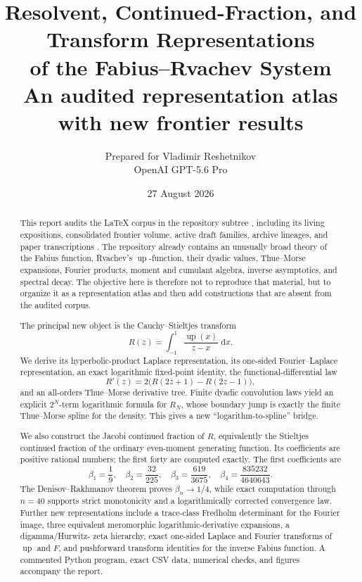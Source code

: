 \documentclass[11pt]{article}
\title{\textbf{Resolvent, Continued-Fraction, and Transform Representations\\
       of the Fabius--Rvachev System}\\[5pt]
       \large An audited representation atlas with new frontier results}
\author{Prepared for Vladimir Reshetnikov\\
        OpenAI GPT-5.6 Pro}
\date{27 August 2026}
\theoremstyle{definition}
\theoremstyle{remark}
\newcommand{\dd}{\,\mathrm d}
\newcommand{\Up}{\operatorname{up}}
\begin{document}
\maketitle

\begin{abstract}
This report audits the LaTeX corpus in the repository subtree
, including its living expositions, consolidated frontier
volume, active draft families, archive lineages, and paper transcriptions \cite{p3:Repository}.  The repository already contains an unusually
broad theory of the Fabius function, Rvachev's \(\Up\)-function, their dyadic values,
Thue--Morse expansions, Fourier products, moment and cumulant algebra, inverse asymptotics,
and spectral decay.  The objective here is therefore not to reproduce that material, but to
organize it as a representation atlas and then add constructions that are absent from the
audited corpus.

The principal new object is the Cauchy--Stieltjes transform
\[
 R(z)=\int_{-1}^{1}\frac{\Up(x)}{z-x}\,\dd x.
\]
We derive its hyperbolic-product Laplace representation, its one-sided Fourier--Laplace
representation, an exact logarithmic fixed-point identity, the functional-differential law
\[
 R'(z)=2\bigl(R(2z+1)-R(2z-1)\bigr),
\]
and an all-orders Thue--Morse derivative tree.  Finite dyadic convolution laws yield an
explicit \(2^N\)-term logarithmic formula for \(R_N\), whose boundary jump is exactly the
finite Thue--Morse spline for the density.  This gives a new ``logarithm-to-spline'' bridge.

We also construct the Jacobi continued fraction of \(R\), equivalently the Stieltjes
continued fraction of the ordinary even-moment generating function.  Its coefficients are
positive rational numbers; the first forty are computed exactly.  The first coefficients are
\[
 \beta_1=\frac19,\quad \beta_2=\frac{32}{225},\quad
 \beta_3=\frac{619}{3675},\quad
 \beta_4=\frac{835232}{4640643}.
\]
The Denisov--Rakhmanov theorem proves \(\beta_n\to1/4\), while exact computation through
\(n=40\) supports strict monotonicity and a logarithmically corrected convergence law.
Further new representations include a trace-class Fredholm determinant for the Fourier
image, three equivalent meromorphic logarithmic-derivative expansions, a digamma/Hurwitz-
zeta hierarchy, exact one-sided Laplace and Fourier transforms of \(\Up\) and \(F\), and
pushforward transform identities for the inverse Fabius function.  A commented Python
program, exact CSV data, numerical checks, and figures accompany the report.
\end{abstract}
\end{document}
